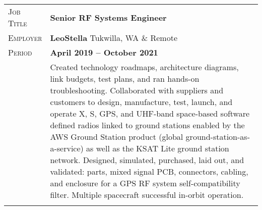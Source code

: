 \documentclass[a4paper, oneside, final]{scrartcl}
\newcommand{\gray}{\rowcolor[gray]{.90}} %
\begin{document}
\begin{center}
\begin{tabularx}{0.97\linewidth}{>{\raggedleft\scshape}p{2cm}X}
\gray Job Title & \textbf{Senior RF Systems Engineer}\\
\gray Employer & \textbf{LeoStella} \hfill Tukwilla, WA \& Remote\\
\gray Period & \textbf{April 2019 -- October 2021}\\
&
\vspace{-0.15 cm}
Created technology roadmaps, architecture diagrams, link budgets, test plans, and ran hands-on troubleshooting. Collaborated with suppliers and customers to design, manufacture, test, launch, and operate X, S, GPS, and UHF-band space-based software defined radios linked to ground stations enabled by the AWS Ground Station product (global ground-station-as-a-service) as well as the KSAT Lite ground station network.
\newline
\newline
Designed, simulated, purchased, laid out, and validated: parts, mixed signal PCB, connectors, cabling, and enclosure for a GPS RF system self-compatibility filter.  Multiple spacecraft successful in-orbit operation.
\\
\\
\end{tabularx}


\end{center}
\end{document}
